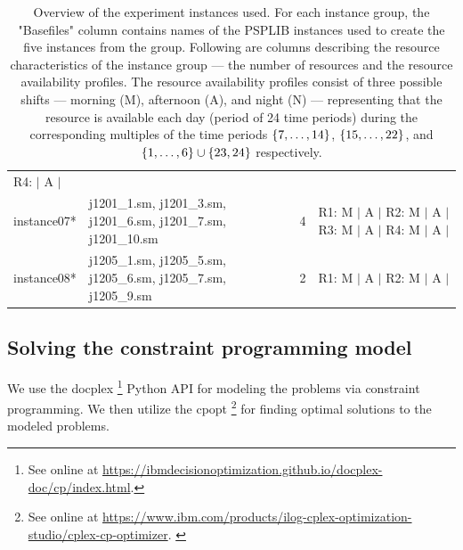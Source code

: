 \begin{table}[p]
\begin{tabularx}{0.88\textwidth}{lXcX}
                      R4: \phantom{M} $|$ A $|$
                    \\
                    \cmidrule[0.01em](lr){1-4}
        instance07* & j1201\_1.sm, j1201\_3.sm, j1201\_6.sm, j1201\_7.sm, j1201\_10.sm
                    & 4 
                    & R1: M $|$ A $|$ \newline
                      R2: M $|$ A $|$ \newline
                      R3: M $|$ A $|$ \newline
                      R4: M $|$ A $|$
                    \\
                    \cmidrule[0.01em](lr){1-4}
        instance08* & j1205\_1.sm, j1205\_5.sm, j1205\_6.sm, j1205\_7.sm, j1205\_9.sm
                    & 2 
                    & R1: M $|$ A $|$ \newline
                      R2: M $|$ A $|$
                    \\
        \bottomrule
    \end{tabularx}
    \caption{
        Overview of the experiment instances used.
        For each instance group,
        the "Basefiles" column contains names of the PSPLIB instances
        used to create the five instances from the group.
        Following are columns describing the resource characteristics of the instance group ---
        the number of resources and the resource availability profiles.
        The resource availability profiles consist of three possible shifts ---
        morning (M), afternoon (A), and night (N) ---
        representing that the resource is available each day (period of 24 time periods)
        during the corresponding multiples of the time periods
        $\{{7}, \dots, {14}\}$, $\{{15}, \dots, {22}\}$, and $\{{1}, \dots, {6}\} \cup \{23, 24\}$ respectively.
        }
    \label{tab:instances}
\end{table}

\subsection{Solving the constraint programming model} \label{subsec:numerical-experiments/setup/solving-cp-model}

We use the \ac{docplex}%
\footnote{See online at \url{https://ibmdecisionoptimization.github.io/docplex-doc/cp/index.html}.}
Python API for modeling the problems via constraint programming.
We then utilize the \ac{cpopt}%
\footnote{See online at \url{https://www.ibm.com/products/ilog-cplex-optimization-studio/cplex-cp-optimizer}. \citep{WEB_IBM_CPLEX}}
for finding optimal solutions to the modeled problems.

